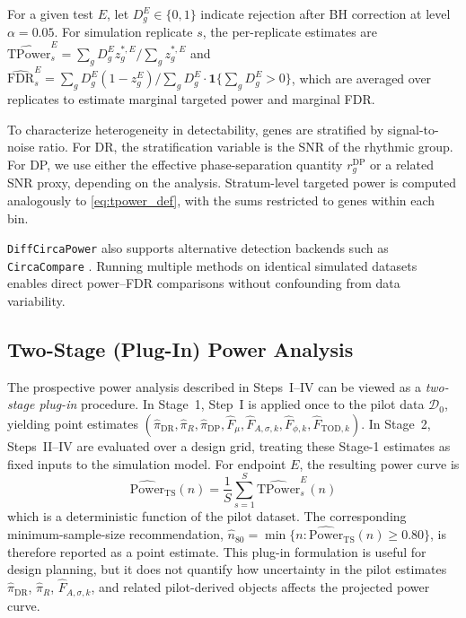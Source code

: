 \documentclass{article}
\newcommand{\software}[1]{\texttt{#1}}
\begin{document}
For a given test $E$, let $D_g^E\in\{0,1\}$ indicate rejection after BH
correction at level $\alpha=0.05$. For simulation replicate $s$, the
per-replicate estimates are
\(\widehat{\mathrm{TPower}}_s^{E}=\sum_g D_g^{E} z_g^{*,E}/\sum_g z_g^{*,E}\)
and
\(\widehat{\mathrm{FDR}}_s^{E}=\sum_g D_g^{E}(1-z_g^{E})/\sum_g D_g^{E}
\cdot\mathbf{1}\!\{\sum_g D_g^{E}>0\}\),
which are averaged over replicates to estimate marginal targeted power and
marginal FDR.

To characterize heterogeneity in detectability, genes are stratified by
signal-to-noise ratio. For DR, the stratification variable is the SNR of the
rhythmic group. For DP, we use either the effective phase-separation quantity
$r_g^{\mathrm{DP}}$ or a related SNR proxy, depending on the analysis. Stratum-level
targeted power is computed analogously to \eqref{eq:tpower_def}, with the
sums restricted to genes within each bin.

\software{DiffCircaPower} also supports alternative detection backends such as
\software{CircaCompare} \cite{parsons2020circacompare}. Running multiple
methods on identical simulated datasets enables direct power--FDR comparisons
without confounding from data variability.

\subsection{Two-Stage (Plug-In) Power Analysis}
\label{sec:two_stage}

The prospective power analysis described in Steps~I--IV can be viewed as a
\emph{two-stage plug-in} procedure. In Stage~1, Step~I is applied once to the
pilot data $\mathcal{D}_0$, yielding point estimates
$(\hat{\pi}_{\mathrm{DR}},\hat{\pi}_R,\hat{\pi}_{\mathrm{DP}},
\hat{F}_{\mu},\hat{F}_{A,\sigma,k},\hat{F}_{\phi,k},\hat{F}_{\mathrm{TOD},k})$.
In Stage~2, Steps~II--IV are evaluated over a design grid, treating these
Stage-1 estimates as fixed inputs to the simulation model. For endpoint $E$,
the resulting power
curve is
\begin{equation}
\widehat{\mathrm{Power}}_{\mathrm{TS}}(n)
=
\frac{1}{S}\sum_{s=1}^{S}\widehat{\mathrm{TPower}}_s^{E}(n)
\label{eq:two_stage_power}
\end{equation}
which is a deterministic function of the pilot dataset. The corresponding
minimum-sample-size recommendation,
\(\hat{n}_{80}=\min\!\{n:\widehat{\mathrm{Power}}_{\mathrm{TS}}(n)\geq 0.80\}\),
is therefore reported as a point estimate. This plug-in formulation is useful
for design planning, but it does not quantify how uncertainty in the pilot
estimates $\hat{\pi}_{\mathrm{DR}}$, $\hat{\pi}_R$,
$\hat{F}_{A,\sigma,k}$, and related pilot-derived objects affects the projected
power curve.
\end{document}
